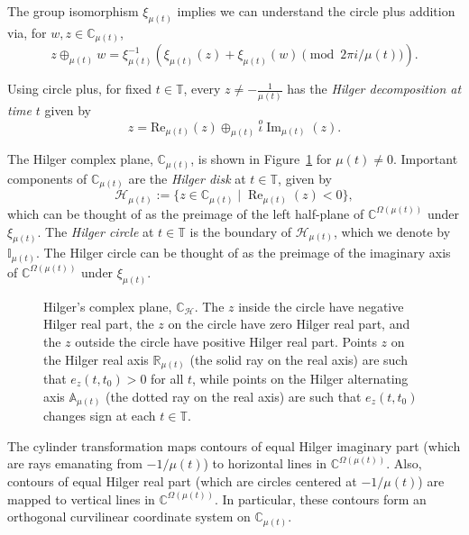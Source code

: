 \documentclass[10pt,a4paper]{amsart}
\DeclareMathOperator{\myRe}{Re}
\numberwithin{equation}{section}
\begin{document}
The group isomorphism $\xi_{\mu(t)}$ implies we can understand the circle plus
addition via, for $w,z \in \mathbb{C}_{\mu(t)}$,
\begin{equation}
\label{eq:oplusViaXi}
z \oplus_{\mu(t)} w = \xi_{\mu(t)}^{-1}(\xi_{\mu(t)}(z)
+ \xi_{\mu(t)}(w) \pmod{2 \pi i/\mu(t)}).
\end{equation}

Using circle plus, for fixed $t \in \mathbb{T}$, every $z \neq -\frac{1}{\mu(t)}$ has the
\emph{Hilger decomposition at time $t$} given by
$$
z=\text{Re}_{\mu(t)}(z) \oplus_{\mu(t)} \stackrel{o}{\iota}
\operatorname{Im}_{\mu(t)}(z).
$$

The Hilger complex plane, $\mathbb{C}_{\mu(t)}$, is shown in
Figure~\ref{fig:complexplane} for $\mu(t)\neq 0$.
Important components of $\mathbb{C}_{\mu(t)}$ are the \emph{Hilger disk}
at $t\in \mathbb{T}$, given by
$$
 \mathcal{H}_{\mu(t)} := \{ z \in \mathbb{C}_{\mu(t)} \mid \myRe_{\mu(t)}(z) < 0 \},
$$
which can be thought of as the preimage of the left half-plane of
$\mathbb{C}^{\Omega(\mu(t))}$ under $\xi_{\mu(t)}$.
The \emph{Hilger circle} at $t \in \mathbb{T}$ is the boundary of $\mathcal{H}_{\mu(t)}$,
which we denote by $\mathbb{I}_{\mu(t)}$.
The Hilger circle can be thought of as the preimage of the imaginary axis of
$\mathbb{C}^{\Omega(\mu(t))}$ under $\xi_{\mu(t)}$.


\begin{figure}[t]
  \centering
  
  \caption{Hilger's complex plane, $\mathbb{C}_{\mathcal{H}}$. The $z$ inside the circle have negative
  Hilger real part, the $z$ on the circle have zero Hilger real part, and the
  $z$ outside the circle have positive Hilger real part. Points $z$ on the
  Hilger real axis $\mathbb{R}_{\mu(t)}$ (the solid ray on the real axis) are such
  that $e_{z}(t,t_0)>0$ for all $t$, while points on the Hilger alternating axis
  $\mathbb{A}_{\mu(t)}$ (the dotted ray on the real axis) are such that $e_{z}(t,t_0)$
  changes sign at each $t \in \mathbb{T}$.}
  \label{fig:complexplane}
\end{figure}



The cylinder transformation maps contours of equal Hilger imaginary part
(which are rays emanating from $-1/\mu(t)$) to horizontal lines in
$\mathbb{C}^{\Omega(\mu(t))}$. Also, contours of equal Hilger real part
(which are circles centered at $-1/\mu(t)$) are mapped to vertical lines in
$\mathbb{C}^{\Omega(\mu(t))}$. In particular, these contours form an orthogonal curvilinear coordinate system on $\mathbb{C}_{\mu(t)}$.
\end{document}
